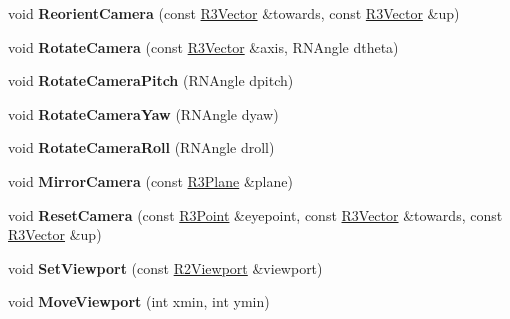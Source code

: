 \begin{DoxyCompactItemize}
\item 
void {\bfseries Reorient\+Camera} (const \hyperlink{class_r3_vector}{R3\+Vector} \&towards, const \hyperlink{class_r3_vector}{R3\+Vector} \&up)\hypertarget{class_r3_viewer_a44e2d8487689a946839002ba77ec7ede}{}\label{class_r3_viewer_a44e2d8487689a946839002ba77ec7ede}

\item 
void {\bfseries Rotate\+Camera} (const \hyperlink{class_r3_vector}{R3\+Vector} \&axis, R\+N\+Angle dtheta)\hypertarget{class_r3_viewer_a67815a06f6e2c3a69fe5f9f962f1b262}{}\label{class_r3_viewer_a67815a06f6e2c3a69fe5f9f962f1b262}

\item 
void {\bfseries Rotate\+Camera\+Pitch} (R\+N\+Angle dpitch)\hypertarget{class_r3_viewer_aa2109410674dfe1ca7ddcc28d0d774f6}{}\label{class_r3_viewer_aa2109410674dfe1ca7ddcc28d0d774f6}

\item 
void {\bfseries Rotate\+Camera\+Yaw} (R\+N\+Angle dyaw)\hypertarget{class_r3_viewer_a36f5ea32d1a459d781fd425bb25f28a6}{}\label{class_r3_viewer_a36f5ea32d1a459d781fd425bb25f28a6}

\item 
void {\bfseries Rotate\+Camera\+Roll} (R\+N\+Angle droll)\hypertarget{class_r3_viewer_a95284f40ee826ef41a7c1b1eae0e4832}{}\label{class_r3_viewer_a95284f40ee826ef41a7c1b1eae0e4832}

\item 
void {\bfseries Mirror\+Camera} (const \hyperlink{class_r3_plane}{R3\+Plane} \&plane)\hypertarget{class_r3_viewer_a87d4032138401b4b3ecab5b4cea35a45}{}\label{class_r3_viewer_a87d4032138401b4b3ecab5b4cea35a45}

\item 
void {\bfseries Reset\+Camera} (const \hyperlink{class_r3_point}{R3\+Point} \&eyepoint, const \hyperlink{class_r3_vector}{R3\+Vector} \&towards, const \hyperlink{class_r3_vector}{R3\+Vector} \&up)\hypertarget{class_r3_viewer_a858108c5ee654358690a37addcd6127d}{}\label{class_r3_viewer_a858108c5ee654358690a37addcd6127d}

\item 
void {\bfseries Set\+Viewport} (const \hyperlink{class_r2_viewport}{R2\+Viewport} \&viewport)\hypertarget{class_r3_viewer_a81f87e1b52dbc6a3dd2e3695baf96f22}{}\label{class_r3_viewer_a81f87e1b52dbc6a3dd2e3695baf96f22}

\item 
void {\bfseries Move\+Viewport} (int xmin, int ymin)\hypertarget{class_r3_viewer_a87b072d58c70bc523c6f3ce5bd9ee1ba}{}\label{class_r3_viewer_a87b072d58c70bc523c6f3ce5bd9ee1ba}


\end{DoxyCompactItemize}
